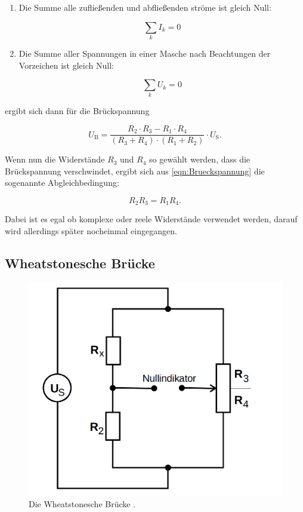 \begin{enumerate}
    \item Die Summe alle zufließenden und abfließenden ströme ist gleich Null:
    
    \begin{equation}
        \sum_k I_k = 0
    \end{equation}
    \item Die Summe aller Spannungen in einer Masche nach Beachtungen der Vorzeichen ist gleich Null:
    
    \begin{equation}
        \sum_k U_k = 0
    \end{equation}
\end{enumerate}

ergibt sich dann für die Brückspannung 

\begin{equation}
    U_\text{B} = \frac{R_2\cdot R_3 - R_1 \cdot R_4}{(R_3 + R_4) \cdot (R_1 + R_2)} \cdot U_\text{S} .
    \label{eqn:Brueckspannung}
\end{equation}

Wenn nun die Widerstände $R_3$ und $R_4$ so gewählt werden, dass die Brückspannung verschwindet,
ergibt sich aus \eqref{eqn:Brueckspannung} die sogenannte Abgleichbedingung:

\begin{equation}
    R_2 R_3 = R_1 R_4 .
    \label{eqn:abgleich}
\end{equation}

Dabei ist es egal ob komplexe oder reele Widerstände verwendet werden, darauf wird allerdings später nocheinmal eingegangen.

\subsection{Wheatstonesche Brücke}

\begin{figure}
    \centering
    \includegraphics[scale=0.25]{content/Wheatstonesche.png}
    \caption{Die Wheatstonesche Brücke \cite[S. 219]{anleitung}.}
    \label{fig:wheatstonesche}
\end{figure}

